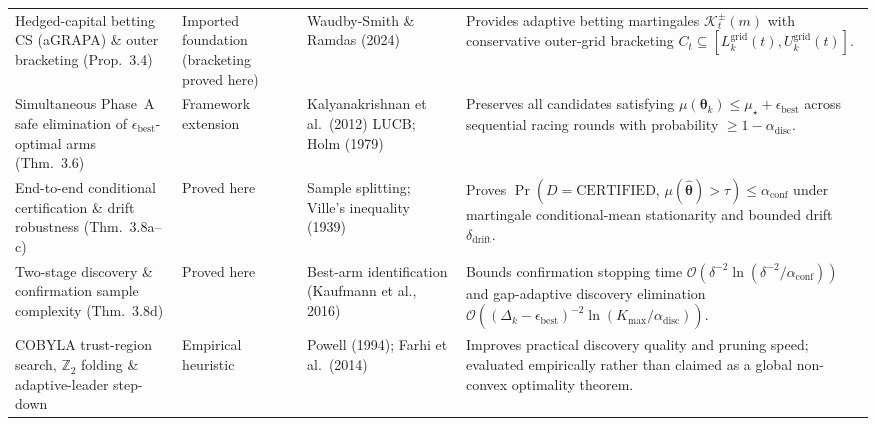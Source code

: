 \begin{table}[htbp]
\begin{tabular}{@{}p{4.3cm} p{3.1cm} p{4.2cm} p{5.4cm}@{}}
Hedged-capital betting CS (aGRAPA) \& outer bracketing (Prop.~3.4) & Imported foundation (bracketing proved here) & Waudby-Smith \& Ramdas (2024) & Provides adaptive betting martingales $\mathcal{K}_t^\pm(m)$ with conservative outer-grid bracketing $C_t \subseteq [L_k^{\mathrm{grid}}(t), U_k^{\mathrm{grid}}(t)]$. \\
Simultaneous Phase~A safe elimination of $\epsilon_{\mathrm{best}}$-optimal arms (Thm.~3.6) & Framework extension & Kalyanakrishnan et al.\ (2012) LUCB; Holm (1979) & Preserves all candidates satisfying $\mu(\bm{\theta}_k) \le \mu_\star + \epsilon_{\mathrm{best}}$ across sequential racing rounds with probability $\ge 1-\alpha_{\mathrm{disc}}$. \\
End-to-end conditional certification \& drift robustness (Thm.~3.8a--c) & Proved here & Sample splitting; Ville's inequality (1939) & Proves $\Pr(D=\mathrm{CERTIFIED},\, \mu(\hat{\bm{\theta}})>\tau) \le \alpha_{\mathrm{conf}}$ under martingale conditional-mean stationarity and bounded drift $\delta_{\mathrm{drift}}$. \\
Two-stage discovery \& confirmation sample complexity (Thm.~3.8d) & Proved here & Best-arm identification (Kaufmann et al., 2016) & Bounds confirmation stopping time $\mathcal{O}(\delta^{-2}\ln(\delta^{-2}/\alpha_{\mathrm{conf}}))$ and gap-adaptive discovery elimination $\mathcal{O}((\Delta_k-\epsilon_{\mathrm{best}})^{-2}\ln(K_{\max}/\alpha_{\mathrm{disc}}))$. \\
COBYLA trust-region search, $\mathbb{Z}_2$ folding \& adaptive-leader step-down & Empirical heuristic & Powell (1994); Farhi et al.\ (2014) & Improves practical discovery quality and pruning speed; evaluated empirically rather than claimed as a global non-convex optimality theorem. \\
\bottomrule
\end{tabular}
\end{table}

